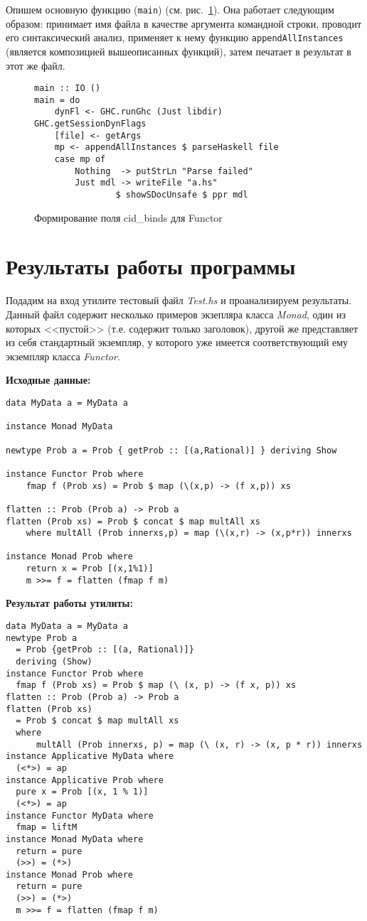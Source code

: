 Опишем основную функцию (\lstinline{main}) (см. рис.~\ref{main}). Она работает следующим образом: принимает имя файла в качестве аргумента командной строки, проводит его синтаксический анализ, применяет к нему функцию \lstinline{appendAllInstances} (является композицией вышеописанных функций), затем печатает в результат в этот же файл.

\begin{figure}[h]
\hrulefill
\begin{lstlisting}
main :: IO ()
main = do
    dynFl <- GHC.runGhc (Just libdir) GHC.getSessionDynFlags
    [file] <- getArgs
    mp <- appendAllInstances $ parseHaskell file
    case mp of
        Nothing  -> putStrLn "Parse failed"
        Just mdl -> writeFile "a.hs" 
                $ showSDocUnsafe $ ppr mdl
\end{lstlisting}
\hrulefill
\caption{Формирование поля cid\_binds для Functor}\label{main}
\end{figure}

\newpage
\section{Результаты работы программы}
Подадим на вход утилите тестовый файл \textit{Test.hs} и проанализируем результаты. Данный файл содержит несколько примеров экзепляра класса \textit{Monad}, один из которых <<пустой>> (т.е. содержит только заголовок), другой же представляет из себя стандартный экземпляр, у которого уже имеется соответствующий ему экземпляр класса \textit{Functor}.



\textbf{Исходные данные:}
\begin{lstlisting}
data MyData a = MyData a

instance Monad MyData

newtype Prob a = Prob { getProb :: [(a,Rational)] } deriving Show

instance Functor Prob where  
    fmap f (Prob xs) = Prob $ map (\(x,p) -> (f x,p)) xs 
 
flatten :: Prob (Prob a) -> Prob a  
flatten (Prob xs) = Prob $ concat $ map multAll xs  
    where multAll (Prob innerxs,p) = map (\(x,r) -> (x,p*r)) innerxs

instance Monad Prob where  
    return x = Prob [(x,1%1)]  
    m >>= f = flatten (fmap f m)
\end{lstlisting}
\textbf{Результат работы утилиты:}
\begin{lstlisting}
data MyData a = MyData a
newtype Prob a
  = Prob {getProb :: [(a, Rational)]}
  deriving (Show)
instance Functor Prob where
  fmap f (Prob xs) = Prob $ map (\ (x, p) -> (f x, p)) xs
flatten :: Prob (Prob a) -> Prob a
flatten (Prob xs)
  = Prob $ concat $ map multAll xs
  where
      multAll (Prob innerxs, p) = map (\ (x, r) -> (x, p * r)) innerxs
instance Applicative MyData where
  (<*>) = ap
instance Applicative Prob where
  pure x = Prob [(x, 1 % 1)]
  (<*>) = ap
instance Functor MyData where
  fmap = liftM
instance Monad MyData where
  return = pure
  (>>) = (*>)
instance Monad Prob where
  return = pure
  (>>) = (*>)
  m >>= f = flatten (fmap f m)
\end{lstlisting}

